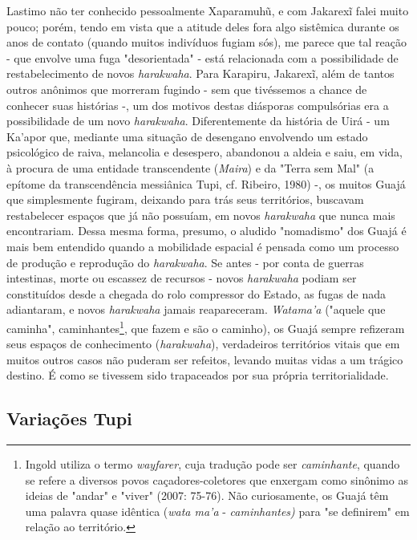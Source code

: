 Lastimo não ter conhecido pessoalmente Xaparamuhũ, e com Jakarexĩ falei
muito pouco; porém, tendo em vista que a atitude deles fora algo
sistêmica durante os anos de contato (quando muitos indivíduos fugiam
sós), me parece que tal reação - que envolve uma fuga "desorientada" -
está relacionada com a possibilidade de restabelecimento de novos
\emph{harakwaha}. Para Karapiru, Jakarexĩ, além de tantos outros
anônimos que morreram fugindo - sem que tivéssemos a chance de conhecer
suas histórias -, um dos motivos destas diásporas compulsórias era a
possibilidade de um novo \emph{harakwaha}. Diferentemente da história de
Uirá - um Ka'apor que, mediante uma situação de desengano envolvendo um
estado psicológico de raiva, melancolia e desespero, abandonou a aldeia
e saiu, em vida, à procura de uma entidade transcendente (\emph{Maira})
e da "Terra sem Mal" (a epítome da transcendência messiânica Tupi, cf.
Ribeiro, 1980) -, os muitos Guajá que simplesmente fugiram, deixando
para trás seus territórios, buscavam restabelecer espaços que já não
possuíam, em novos \emph{harakwaha} que nunca mais encontrariam. Dessa
mesma forma, presumo, o aludido "nomadismo" dos Guajá é mais bem
entendido quando a mobilidade espacial é pensada como um processo de
produção e reprodução do \emph{harakwaha}. Se antes - por conta de
guerras intestinas, morte ou escassez de recursos - novos
\emph{harakwaha} podiam ser constituídos desde a chegada do rolo
compressor do Estado, as fugas de nada adiantaram, e novos
\emph{harakwaha} jamais reapareceram. \emph{Watama'a} ("aquele que
caminha", caminhantes\footnote{Ingold utiliza o termo \emph{wayfarer},
  cuja tradução pode ser \emph{caminhante}, quando se refere a diversos
  povos caçadores-coletores que enxergam como sinônimo as ideias de
  "andar" e "viver" (2007: 75-76). Não curiosamente, os Guajá têm uma
  palavra quase idêntica (\emph{wata ma'a} - \emph{caminhantes)} para
  "se definirem" em relação ao território.}, que fazem e são o caminho),
os Guajá sempre refizeram seus espaços de conhecimento
(\emph{harakwaha}), verdadeiros territórios vitais que em muitos outros
casos não puderam ser refeitos, levando muitas vidas a um trágico
destino. É como se tivessem sido trapaceados por sua própria
territorialidade.

\hypertarget{variauxe7uxf5es-tupi}{%
\subsection{Variações Tupi}\label{variauxe7uxf5es-tupi}}

